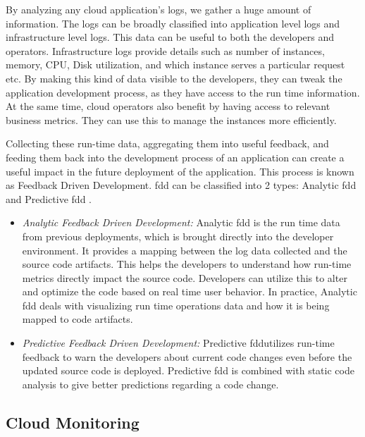 \documentclass[article,type=msc,colorback,12pt,accentcolor=tud8b,table]{tudthesis}
\begin{document}
		By analyzing any cloud application's logs, we gather a huge amount of information. The logs can be broadly classified into application level logs and infrastructure level logs. This data can be useful to both the developers and operators. Infrastructure logs provide details such as number of instances, memory, CPU, Disk utilization, and which instance serves a particular request etc. By making this kind of data visible to the developers, they can tweak the application development process, as they have access to the run time information. At the same time, cloud operators also benefit by having access to relevant business metrics. They can use this to manage the instances more efficiently. 
		
		\par Collecting these run-time data, aggregating them into useful feedback, and feeding them back into the development process of an application can create a useful impact in the future deployment of the application. This process is known as Feedback Driven Development. \gls{fdd} can be classified into 2 types: Analytic \gls{fdd} and Predictive \gls{fdd} \cite{cito2015runtime}.
		
		\begin{itemize}
			\item{\textit{Analytic Feedback Driven Development: }}
			Analytic \gls{fdd} is the run time data from previous deployments, which is brought directly into the developer environment. It provides a mapping between the log data collected and the source code artifacts. This helps the developers to understand how run-time metrics directly impact the source code. Developers can utilize this to alter and optimize the code based on real time user behavior. In practice, Analytic \gls{fdd} deals with visualizing run time operations data and how it is being mapped to code artifacts. 
			
			\item{\textit{Predictive Feedback Driven Development: }}
			 Predictive \gls{fdd}utilizes run-time feedback to warn the developers about current code changes even before the updated source code is deployed. Predictive \gls{fdd} is combined with static code analysis to give better predictions regarding a code change. 
		\end{itemize}
	
	\subsection{Cloud Monitoring}
 	
\end{document}
